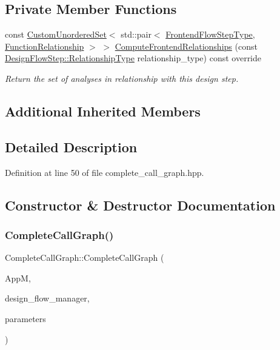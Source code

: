 \subsection*{Private Member Functions}
\begin{DoxyCompactItemize}
\item 
const \hyperlink{classCustomUnorderedSet}{Custom\+Unordered\+Set}$<$ std\+::pair$<$ \hyperlink{frontend__flow__step_8hpp_afeb3716c693d2b2e4ed3e6d04c3b63bb}{Frontend\+Flow\+Step\+Type}, \hyperlink{classFrontendFlowStep_af7cf30f2023e5b99e637dc2058289ab0}{Function\+Relationship} $>$ $>$ \hyperlink{classCompleteCallGraph_a617bb88d81ead716f36a849ed06cc0ea}{Compute\+Frontend\+Relationships} (const \hyperlink{classDesignFlowStep_a723a3baf19ff2ceb77bc13e099d0b1b7}{Design\+Flow\+Step\+::\+Relationship\+Type} relationship\+\_\+type) const override
\begin{DoxyCompactList}\small\item\em Return the set of analyses in relationship with this design step. \end{DoxyCompactList}\end{DoxyCompactItemize}
\subsection*{Additional Inherited Members}


\subsection{Detailed Description}


Definition at line 50 of file complete\+\_\+call\+\_\+graph.\+hpp.



\subsection{Constructor \& Destructor Documentation}
\mbox{\label{classCompleteCallGraph_a6ddf209c4b687c7a494a60f4f9e54b3d}} 
\subsubsection{\texorpdfstring{Complete\+Call\+Graph()}{CompleteCallGraph()}}
{\footnotesize\ttfamily Complete\+Call\+Graph\+::\+Complete\+Call\+Graph (\begin{DoxyParamCaption}\item[{const \hyperlink{application__manager_8hpp_a04ccad4e5ee401e8934306672082c180}{application\+\_\+manager\+Ref}}]{AppM,  }\item[{const Design\+Flow\+Manager\+Const\+Ref}]{design\+\_\+flow\+\_\+manager,  }\item[{const \hyperlink{Parameter_8hpp_a37841774a6fcb479b597fdf8955eb4ea}{Parameter\+Const\+Ref}}]{parameters }\end{DoxyParamCaption})}



